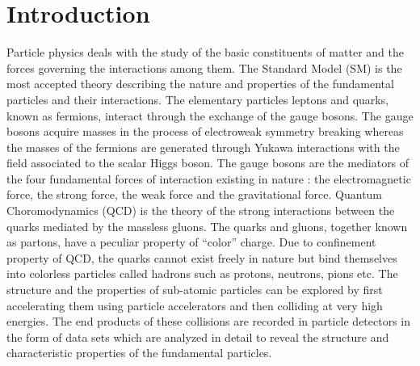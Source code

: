 \chapter{Introduction}
\label{chap:Introduction}

Particle physics deals with the study of the basic constituents of matter and the forces governing the interactions among them. The Standard Model (SM) is the most accepted theory describing the nature and properties of the fundamental particles and their interactions. The elementary particles leptons and quarks, known as fermions, interact through the exchange of the gauge bosons. The gauge bosons acquire masses in the process of electroweak symmetry breaking whereas the masses of the fermions are generated through Yukawa interactions with the field associated to the scalar Higgs boson. The gauge bosons are the mediators of the four fundamental forces of interaction existing in nature : the electromagnetic force, the strong force, the weak force and the gravitational force. Quantum Choromodynamics (QCD) is the theory of the strong interactions between the quarks mediated by the massless gluons. The quarks and gluons, together known as partons, have a peculiar property of ``color'' charge. Due to confinement property of QCD, the quarks cannot exist freely in nature but bind themselves into colorless particles called hadrons such as protons, neutrons, pions etc. The structure and the properties of sub-atomic particles can be explored by first accelerating them using particle accelerators and then colliding at very high energies. The end products of these collisions are recorded in particle detectors in the form of data sets which are analyzed in detail to reveal the structure and characteristic properties of the fundamental particles.


